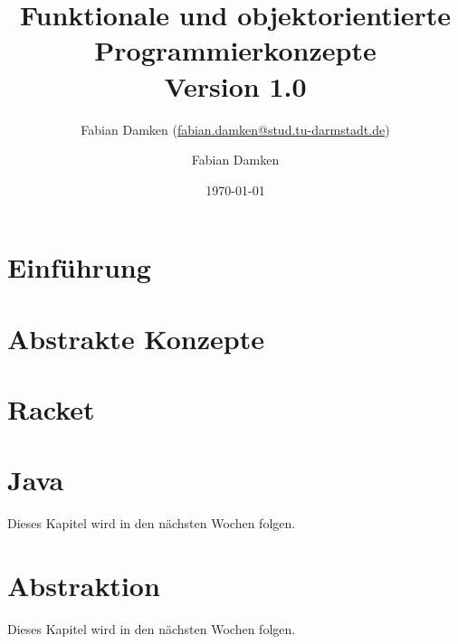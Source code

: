 \documentclass[a4paper, 11pt, accentcolor = tud3b]{tudreport}
\title{Funktionale und objektorientierte Programmierkonzepte \\ Version 1.0}
\subtitle{Fabian Damken (\href{mailto:fabian.damken@stud.tu-darmstadt.de?subject=[FoP-Skript]}{fabian.damken@stud.tu-darmstadt.de})}
\author{Fabian Damken}
\date{\today}
\begin{document}
	

    \maketitle
    \tableofcontents
    \listoftodos

    \chapter{Einführung}
	    \label{c:einfuehrung}
    
        

	\chapter{Abstrakte Konzepte}
		\label{c:abstrakte_konzepte}
	
		

    \chapter{Racket}
	    \label{c:racket}
    
        

    
    \chapter{Java}
    	\label{c:java}
    	
    	Dieses Kapitel wird in den nächsten Wochen folgen.
    
    
    \chapter{Abstraktion}
    	\label{c:abstraktion}
    	
    	Dieses Kapitel wird in den nächsten Wochen folgen.
    

    
    
\end{document}
